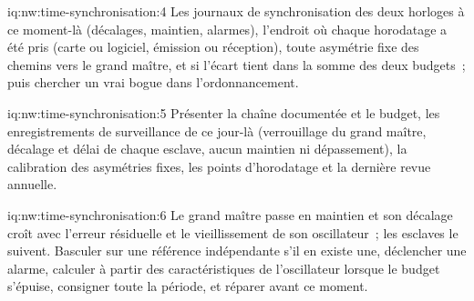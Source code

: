 \begin{solution}{iq:nw:time-synchronisation:4}
Les journaux de synchronisation des deux horloges à ce moment-là (décalages, maintien, alarmes), l'endroit où chaque horodatage a été pris (carte ou logiciel, émission ou
réception), toute asymétrie fixe des chemins vers le grand maître, et si l'écart tient dans la somme des deux budgets~; puis
chercher un vrai bogue dans l'ordonnancement.
\end{solution}

\begin{solution}{iq:nw:time-synchronisation:5}
Présenter la chaîne documentée et le budget, les enregistrements de surveillance de ce jour-là (verrouillage du grand maître, décalage et délai de chaque esclave, aucun
maintien ni dépassement), la calibration des asymétries fixes, les points d'horodatage et la dernière revue annuelle.
\end{solution}

\begin{solution}{iq:nw:time-synchronisation:6}
Le grand maître passe en maintien et son décalage croît avec l'erreur résiduelle et le vieillissement de son oscillateur~; les esclaves le suivent. Basculer sur
une référence indépendante s'il en existe une, déclencher une alarme, calculer à partir des caractéristiques de l'oscillateur lorsque le budget s'épuise, consigner toute la
période, et réparer avant ce moment.
\end{solution}
